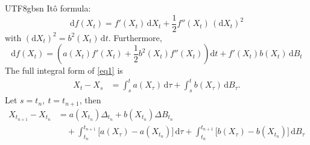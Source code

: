 \documentclass{article}
\begin{document}
\begin{CJK*}{UTF8}{gbsn}
Itô formula:
$$
    \mathrm{d}f(X_t)=f'(X_t)\,\mathrm{d}X_t+\frac{1}{2}f''(X_t)\,(\mathrm{d}X_t)^2
$$
with $(\mathrm{d}X_t)^2=b^2(X_t)\,\mathrm{d}t$.
Furthermore,
\begin{equation}
    \mathrm{d}f(X_t)=\left(a(X_t)f'(X_t)+\frac{1}{2}b^2(X_t)f''(X_t)\right)\mathrm{d}t+f'(X_t)b(X_t)\,\mathrm{d}B_t
\label{eq2}\end{equation}
The full integral form of \ref{eq1} is
$$\begin{aligned}
    X_t-X_s
    &=\int_s^t a(X_\tau)\,\mathrm{d}\tau+\int_s^t b(X_\tau)\,\mathrm{d}B_\tau.
    \end{aligned}
$$
Let $s=t_{n},\ t=t_{n+1}$, then
\begin{equation}
    \begin{aligned}
        X_{t_{n+1}}-X_{t_n}
        &=a(X_{t_n})\Delta_{t_n}+b(X_{t_{n}})\Delta B_{t_n}\\
        &\quad+\int_{t_{n}}^{t_{n+1}}\!\big[a(X_\tau)-a(X_{t_{n}})\big]\,\mathrm{d}\tau
        +\int_{t_{n}}^{t_{n+1}}\!\big[b(X_\tau)-b(X_{t_{n}})\big]\,\mathrm{d}B_\tau
    \end{aligned}\label{eq3}
\end{equation}


\end{CJK*}
\end{document}
